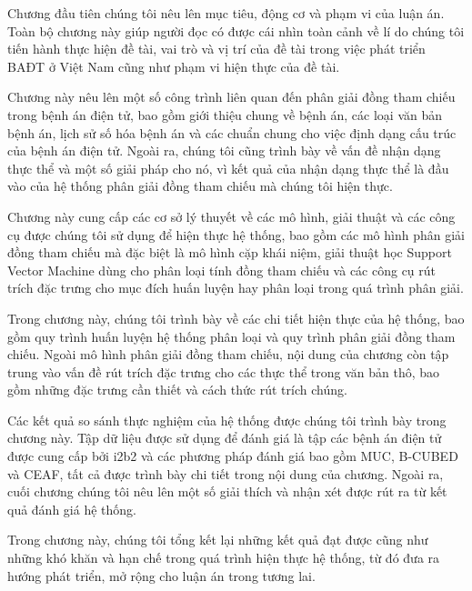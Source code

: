 \begin{description}[style=nextline,leftmargin=0cm]
\item[Chương 1: Tổng quan] Chương đầu tiên chúng tôi nêu lên mục tiêu, động cơ và phạm vi của luận án. Toàn bộ chương này giúp người đọc có được cái nhìn toàn cảnh về lí do chúng tôi tiến hành thực hiện đề tài, vai trò và vị trí của đề tài trong việc phát triển BAĐT ở Việt Nam cũng như phạm vi hiện thực của đề tài.
\item[Chương 2: Các công trình liên quan] Chương này nêu lên một số công trình liên quan đến phân giải đồng tham chiếu trong bệnh án điện tử, bao gồm giới thiệu chung về bệnh án, các loại văn bản bệnh án, lịch sử số hóa bệnh án và các chuẩn chung cho việc định dạng cấu trúc của bệnh án điện tử. Ngoài ra, chúng tôi cũng trình bày về vấn đề nhận dạng thực thể và một số giải pháp cho nó, vì kết quả của nhận dạng thực thể là đầu vào của hệ thống phân giải đồng tham chiếu mà chúng tôi hiện thực.
\item[Chương 3: Kiến thức nền tảng] Chương này cung cấp các cơ sở lý thuyết về các mô hình, giải thuật và các công cụ được chúng tôi sử dụng để hiện thực hệ thống, bao gồm các mô hình phân giải đồng tham chiếu mà đặc biệt là mô hình cặp khái niệm, giải thuật học Support Vector Machine dùng cho phân loại tính đồng tham chiếu và các công cụ rút trích đặc trưng cho mục đích huấn luyện hay phân loại trong quá trình phân giải.
\item[Chương 4: Hiện thực hệ thống] Trong chương này, chúng tôi trình bày về các chi tiết hiện thực của hệ thống, bao gồm quy trình huấn luyện hệ thống phân loại và quy trình phân giải đồng tham chiếu. Ngoài mô hình phân giải đồng tham chiếu, nội dung của chương còn tập trung vào vấn đề rút trích đặc trưng cho các thực thể trong văn bản thô, bao gồm những đặc trưng cần thiết và cách thức rút trích chúng.
\item[Chương 5: Thí nghiệm đánh giá] Các kết quả so sánh thực nghiệm của hệ thống được chúng tôi trình bày trong chương này. Tập dữ liệu được sử dụng để đánh giá là tập các bệnh án điện tử được cung cấp bởi i2b2 và các phương pháp đánh giá bao gồm MUC, B-CUBED và CEAF, tất cả được trình bày chi tiết trong nội dung của chương. Ngoài ra, cuối chương chúng tôi nêu lên một số giải thích và nhận xét được rút ra từ kết quả đánh giá hệ thống.
\item[Chương 6: Tổng kết] 
Trong chương này, chúng tôi tổng kết lại những kết quả đạt được cũng như những khó khăn và hạn chế trong quá trình hiện thực hệ thống, từ đó đưa ra hướng phát triển, mở rộng cho luận án trong tương lai.
\end{description}
